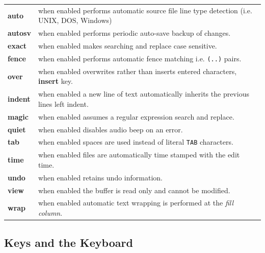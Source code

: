\documentclass[11pt,a4paper,pdftex]{article}
\begin{document}
  \begin{longtable}{l@{\ --\ }p{5.8in}}
    \endhead
    \endfoot
    \endlastfoot

    \textbf{auto} & when enabled performs automatic source file line type
    detection (i.e. UNIX, DOS, Windows) \\

    \textbf{autosv} & when enabled performs periodic auto-save backup of
    changes.\\

    \textbf{exact} & when enabled makes searching and replace case
    sensitive.\\

    \textbf{fence} & when enabled performs automatic fence matching i.e.
    \texttt{(..)} pairs.\\

    \textbf{over} & when enabled overwrites rather than inserts entered
    characters, \textbf{insert} key.\\

    \textbf{indent} & when enabled a new line of text automatically inherits
    the previous lines left indent.\\

    \textbf{magic} & when enabled assumes a regular expression search and
    replace.\\

    \textbf{quiet} & when enabled disables audio beep on an error.\\

    \textbf{tab} & when enabled spaces are used instead of literal
    \texttt{TAB} characters.\\

    \textbf{time} & when enabled files are automatically time stamped with
    the edit time.\\

    \textbf{undo} & when enabled retains undo information.\\

    \textbf{view} & when enabled the buffer is read only and cannot be
    modified.\\

    \textbf{wrap} & when enabled automatic text wrapping is performed at the
    \textit{fill column}.\\

  \end{longtable}

\subsection{Keys and the Keyboard}
\end{document}

